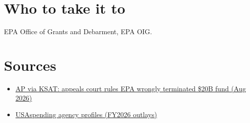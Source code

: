 \documentclass[letterpaper,11pt]{article}
\providecommand{\tightlist}{\setlength{\itemsep}{0pt}\setlength{\parskip}{0pt}}
\begin{document}
\hypertarget{who-to-take-it-to}{%
\section{Who to take it to}\label{who-to-take-it-to}}

EPA Office of Grants and Debarment, EPA OIG.

\hypertarget{sources}{%
\section{Sources}\label{sources}}

\begin{itemize}
\tightlist
\item
  \href{https://www.ksat.com/news/national/2026/08/04/divided-federal-appeals-court-says-trump-administration-was-wrong-to-terminate-climate-program/}{AP
  via KSAT: appeals court rules EPA wrongly terminated \$20B fund (Aug
  2026)}
\item
  \href{https://www.usaspending.gov/agency}{USAspending agency profiles
  (FY2026 outlays)}
\end{itemize}
\end{document}
